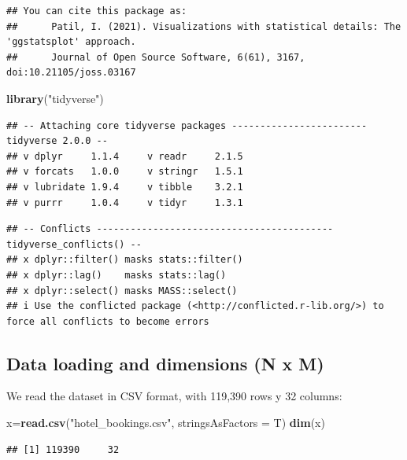 \documentclass[
]{article}
\newenvironment{Shaded}{\begin{snugshade}}{\end{snugshade}}
\newcommand{\AttributeTok}[1]{\textcolor[rgb]{0.13,0.29,0.53}{#1}}
\newcommand{\FunctionTok}[1]{\textcolor[rgb]{0.13,0.29,0.53}{\textbf{#1}}}
\newcommand{\NormalTok}[1]{#1}
\newcommand{\OtherTok}[1]{\textcolor[rgb]{0.56,0.35,0.01}{#1}}
\newcommand{\StringTok}[1]{\textcolor[rgb]{0.31,0.60,0.02}{#1}}
\begin{document}
\begin{verbatim}
## You can cite this package as:
##      Patil, I. (2021). Visualizations with statistical details: The 'ggstatsplot' approach.
##      Journal of Open Source Software, 6(61), 3167, doi:10.21105/joss.03167
\end{verbatim}

\begin{Shaded}
\begin{Highlighting}[]
\FunctionTok{library}\NormalTok{(}\StringTok{"tidyverse"}\NormalTok{)}
\end{Highlighting}
\end{Shaded}

\begin{verbatim}
## -- Attaching core tidyverse packages ------------------------ tidyverse 2.0.0 --
## v dplyr     1.1.4     v readr     2.1.5
## v forcats   1.0.0     v stringr   1.5.1
## v lubridate 1.9.4     v tibble    3.2.1
## v purrr     1.0.4     v tidyr     1.3.1
\end{verbatim}

\begin{verbatim}
## -- Conflicts ------------------------------------------ tidyverse_conflicts() --
## x dplyr::filter() masks stats::filter()
## x dplyr::lag()    masks stats::lag()
## x dplyr::select() masks MASS::select()
## i Use the conflicted package (<http://conflicted.r-lib.org/>) to force all conflicts to become errors
\end{verbatim}

\subsection{Data loading and dimensions (N x
M)}\label{data-loading-and-dimensions-n-x-m}

We read the dataset in CSV format, with 119,390 rows y 32 columns:

\begin{Shaded}
\begin{Highlighting}[]
\NormalTok{x}\OtherTok{=}\FunctionTok{read.csv}\NormalTok{(}\StringTok{"hotel\_bookings.csv"}\NormalTok{, }\AttributeTok{stringsAsFactors =}\NormalTok{ T)}
\FunctionTok{dim}\NormalTok{(x)}
\end{Highlighting}
\end{Shaded}

\begin{verbatim}
## [1] 119390     32
\end{verbatim}
\end{document}
